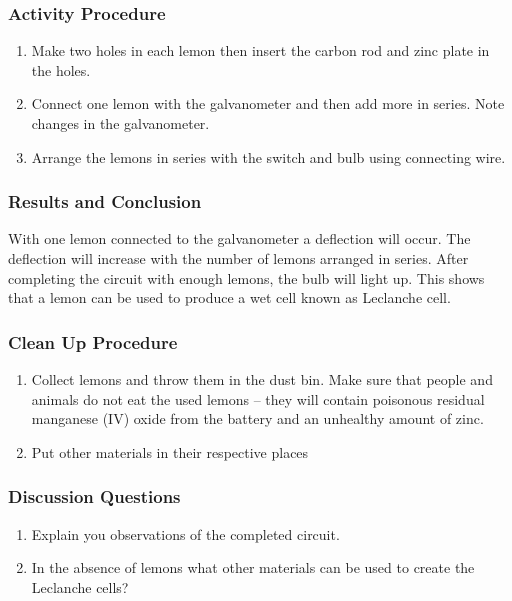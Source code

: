 \subsubsection*{Activity Procedure}
\begin{enumerate}
\item{Make two holes in each lemon then insert the carbon rod and zinc plate in the holes.} 
\item{Connect one lemon with the galvanometer and then add more in series. Note changes in the galvanometer.}
\item{Arrange the lemons in series with the switch and bulb using connecting wire.} 
\end{enumerate}

\subsubsection*{Results and Conclusion}
With one lemon connected to the galvanometer a deflection will occur. The deflection will increase with the number of lemons arranged in series. After completing the circuit with enough lemons, the bulb will light up. This shows that a lemon can be used to produce a wet cell known as Leclanche cell.  

\subsubsection*{Clean Up Procedure}
\begin{enumerate}
\item{Collect lemons and throw them in the dust bin. Make sure that people and animals do not eat the used lemons -- they will contain poisonous residual manganese (IV) oxide from the battery and an unhealthy amount of zinc.}
\item{Put other materials in their respective places}
\end{enumerate}

\subsubsection*{Discussion Questions}
\begin{enumerate}
\item{Explain you observations of the completed circuit.}
\item{In the absence of lemons what other materials can be used to create the Leclanche cells?} 
\end{enumerate}

